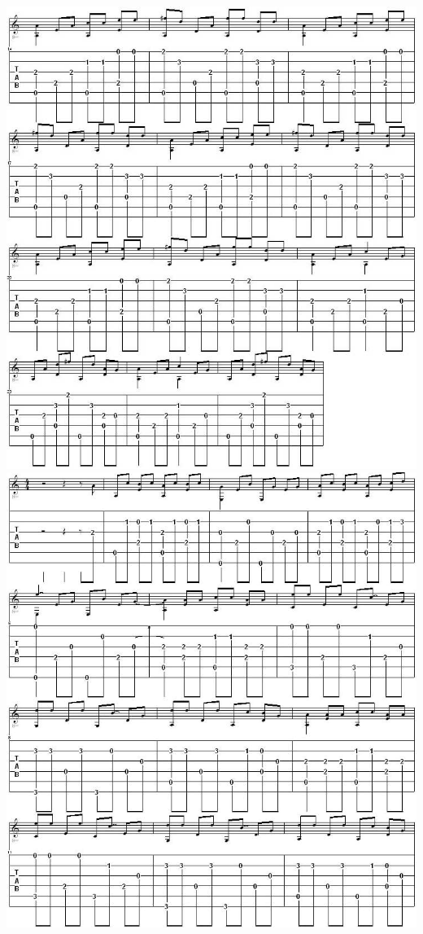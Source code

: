 \documentclass[]{book}
\begin{document}
\includegraphics{notes_and_tabs/mad_world_1.png}
\includegraphics{notes_and_tabs/mad_world_2.png}
\end{document}
